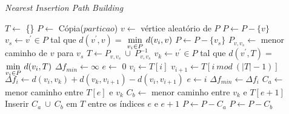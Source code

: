 \begin{algorithm}                   %
	\caption{\textit{Nearest Insertion Path Building}}          %
	\label{nearest_insertion}                           %
	\begin{algorithmic}[1]                   %
		\newline
		\newline
		\State $T \gets $ \{\} 
		\State $P \gets $ Cópia($particao$)
		\State $v \gets $ vértice aleatório de $P$
		\State $P \gets P - \{v\}$
		\State $v_{s} \gets v^{\prime} \in P$ tal que $d(v^{\prime}, v) = $ $\smash{\displaystyle\min_{v_{i} \in P}}\ d(v_{i},v)$ 
		\State $P \gets P - \{v_{s}\}$
		\State $P_{v, v_{s}} \gets $ menor caminho de $v$ para $v_{s}$
		\State $T \gets P_{v, v_{s}}\ \cup\ P_{v, v_{s}}^{-1}$ 
			\State $v_{k} \gets v^{\prime} \in P$ tal que $d(v^{\prime}, T) =$ $\smash{\displaystyle\min_{v_{i} \in P}}\ d(v_{i}, T)$ 
			\State $\Delta f_{min} \gets \infty$
			\State $e \gets $ 0
			 
				\State $v_{i} \gets T[i]$
				\State $v_{i+1} \gets T[i\ mod\ (|T|-1)]$
				\State $\Delta f_{i} \gets d(v_{i},v_{k}) + d(v_{k}, v_{i+1}) - d(v_{i}, v_{i+1})$
					\State $e \gets i$
					\State $\Delta f_{min} \gets \Delta f_{i}$
				\EndIf
			\EndFor
			\State $C_{a} \gets $ menor caminho entre $T[e]$ e $v_{k}$
			\State $C_{b} \gets $ menor caminho entre $v_{k}$ e $T[e+1]$
			\State Inserir $C_{a}\ \cup\ C_{b}$ em $T$ entre os índices $e$ e $e+1$
			\State $P \gets P - C_{a}$
			\State $P \gets P - C_{b}$
		\EndWhile
		\EndProcedure
	\end{algorithmic}
\end{algorithm}

